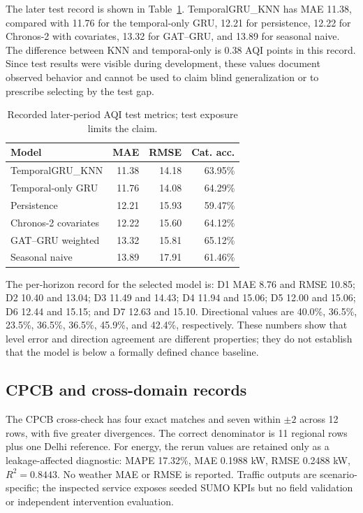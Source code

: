 \documentclass[conference]{IEEEtran}
\begin{document}
The later test record is shown in Table~\ref{tab:test}. TemporalGRU\_KNN has MAE 11.38, compared with 11.76 for the temporal-only GRU, 12.21 for persistence, 12.22 for Chronos-2 with covariates, 13.32 for GAT--GRU, and 13.89 for seasonal naive. The difference between KNN and temporal-only is 0.38 AQI points in this record. Since test results were visible during development, these values document observed behavior and cannot be used to claim blind generalization or to prescribe selecting by the test gap.

\begin{table}[t]
\caption{Recorded later-period AQI test metrics; test exposure limits the claim.}
\label{tab:test}
\centering\scriptsize
\begin{tabular}{@{}lrrr@{}}
\toprule
Model & MAE & RMSE & Cat. acc.\\
\midrule
TemporalGRU\_KNN & 11.38 & 14.18 & 63.95\%\\
Temporal-only GRU & 11.76 & 14.08 & 64.29\%\\
Persistence & 12.21 & 15.93 & 59.47\%\\
Chronos-2 covariates & 12.22 & 15.60 & 64.12\%\\
GAT--GRU weighted & 13.32 & 15.81 & 65.12\%\\
Seasonal naive & 13.89 & 17.91 & 61.46\%\\
\bottomrule
\end{tabular}
\end{table}

The per-horizon record for the selected model is: D1 MAE 8.76 and RMSE 10.85; D2 10.40 and 13.04; D3 11.49 and 14.43; D4 11.94 and 15.06; D5 12.00 and 15.06; D6 12.44 and 15.15; and D7 12.63 and 15.10. Directional values are 40.0\%, 36.5\%, 23.5\%, 36.5\%, 36.5\%, 45.9\%, and 42.4\%, respectively. These numbers show that level error and direction agreement are different properties; they do not establish that the model is below a formally defined chance baseline.

\subsection{CPCB and cross-domain records}
The CPCB cross-check has four exact matches and seven within $\pm2$ across 12 rows, with five greater divergences. The correct denominator is 11 regional rows plus one Delhi reference. For energy, the rerun values are retained only as a leakage-affected diagnostic: MAPE 17.32\%, MAE 0.1988 kW, RMSE 0.2488 kW, $R^2=0.8443$. No weather MAE or RMSE is reported. Traffic outputs are scenario-specific; the inspected service exposes seeded SUMO KPIs but no field validation or independent intervention evaluation.
\end{document}
